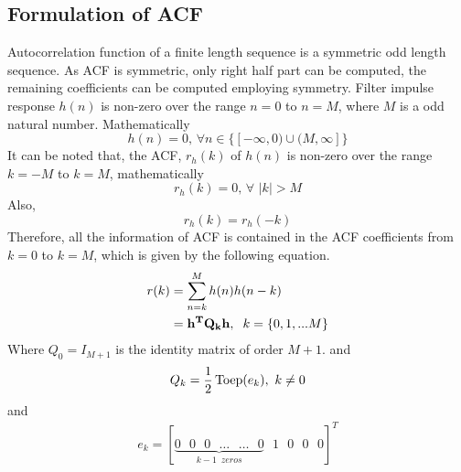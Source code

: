 \subsection{Formulation of ACF}
\label{sub: Formulation of ACF}
Autocorrelation function of a finite length sequence is a symmetric odd length sequence. As ACF is symmetric, only right half part can be computed, the remaining coefficients can be computed employing symmetry. Filter impulse response $h(n)$ is non-zero over the range $n=0$ to $n=M$, where $M$ is a odd natural number. Mathematically
\begin{equation*}
h(n)=0 ,\, \forall n \in \{[-\infty,0) \cup (M,\infty]\}
\end{equation*}
It can be noted that, the ACF, $r_h(k)$ of $h(n)$ is non-zero over the range $k=-M$ to $k=M$, mathematically   
\begin{equation*}
r_h(k)=0 ,\, \forall \,\, |k| > M
\end{equation*}
Also,
$$r_h(k) = r_h(-k)$$
Therefore, all the information of ACF is contained in the ACF coefficients from $k=0$ to $k=M$, which is given by the following equation.
\begin{eqnarray}
\label{eq: ACF}
\begin{aligned}
r(k) &= \sum_{n=k}^{M} h(n)h(n-k)\\
     &= \mathbf{{h^T}{Q_k}h},\hspace{0.2cm} k=\left\{0,1,...M\right\}
\end{aligned}
\end{eqnarray}
Where $Q_0 = I_{M+1}$ is the identity matrix of order $M+1$.
	and
	\begin{eqnarray}
	\label{eq: DSO matrix}
	Q_k = \frac{1}{2} \operatorname{Toep}(e_k),\,\, k\ne 0
	\end{eqnarray}
	and
	\begin{eqnarray}
	e_k = 
	[
	\underbrace{0 \,\,\,\, 0  \,\,\,\, 0 \,\,\,\, \ldots \,\,\,\, \ldots \,\,\,\, 0}_{k -1 \,\,\, zeros} \,\,\,\, 1 \,\,\,\, 0 \,\,\,\, 0 \,\,\,\, 0  
	]^T
	\end{eqnarray}
	
